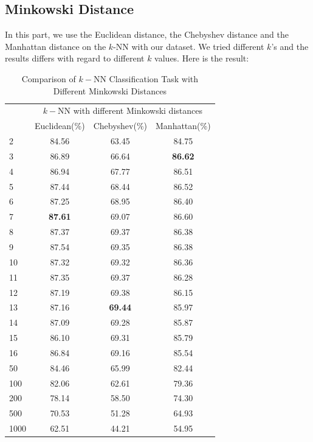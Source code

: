 \documentclass[conference]{IEEEtran}
\begin{document}
\subsection{Minkowski Distance}
In this part, we use the Euclidean distance, the Chebyshev distance and the Manhattan distance on the $k$-NN with our dataset. We tried different $k$'s and the results differs with regard to different $k$ values. Here is the result:
\begin{table}[htbp]
	\centering
 	\newcommand{\tabincell}[2]{\begin{tabular}{@{}#1@{}}#2\end{tabular}}
 	\renewcommand\arraystretch{1.0}
 	\caption{Comparison of $k-$NN Classification Task with Different Minkowski Distances}
 	\label{base0}%
 		\begin{tabular}{@{}p{1cm}<{\centering}|c|c|c}
 		\hline
 		\multirow{2}{*}{\diagbox[height=2\line,width=1.42cm,font=\tiny]{$k$}{Acc.}{$\mathit{M}$}} &
 		\multicolumn{3}{c}{$k-$NN with different Minkowski distances}\\
 		\cline{2-4}
			& Euclidean(\%) & Chebyshev(\%) & Manhattan(\%)\\
 		\hline
 		2   & 84.56 & 63.45 & 84.75 \\
 		3   & 86.89 & 66.64 & \textbf{86.62} \\
 		4   & 86.94 & 67.77 & 86.51 \\
 		5   & 87.44 & 68.44 & 86.52 \\
 		6   & 87.25 & 68.95 & 86.40 \\
 		7   & \textbf{87.61} & 69.07 & 86.60 \\
 		8   & 87.37 & 69.37 & 86.38 \\ 
 		9   & 87.54 & 69.35 & 86.38 \\
 		10   & 87.32 & 69.32 & 86.36 \\
 		11   & 87.35 & 69.37 & 86.28 \\
 		12   & 87.19 & 69.38 & 86.15 \\
 		13   & 87.16 & \textbf{69.44} & 85.97 \\
 		14   & 87.09 & 69.28 & 85.87 \\
 		15   & 86.10 & 69.31 & 85.79 \\
		16   & 86.84 & 69.16 & 85.54 \\
		50   & 84.46 & 65.99 & 82.44 \\
		100   & 82.06 & 62.61 & 79.36 \\
		200   & 78.14 & 58.50 & 74.30 \\
		500   & 70.53 & 51.28 & 64.93 \\
		1000   & 62.51 & 44.21 & 54.95 \\
		\hline
		\end{tabular}
\end{table}
\end{document}
